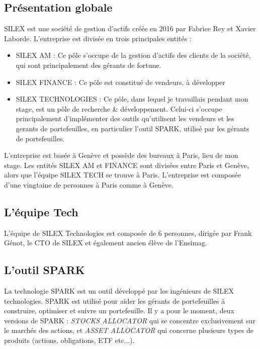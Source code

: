 \documentclass[11pt,a4paper]{article}
\begin{document}
\subsection{Présentation globale}
SILEX est une société de gestion d'actifs créée en 2016 par Fabrice Rey et Xavier Laborde. L'entreprise est divisée en trois principales entités : 
\begin{itemize}
    \item SILEX AM : Ce pôle s'occupe de la gestion d'actifs des clients de la société, qui sont principalement des gérants de fortune.
    \item SILEX FINANCE : Ce pôle est constitué de vendeurs. à développer%
    \item SILEX TECHNOLOGIES : Ce pôle, dans lequel je travaillais pendant mon stage, est un pôle de recherche \& développement. Celui-ci s'occupe principalement d'implémenter des outils qu'utilisent les vendeurs et les gerants de portefeuilles, en particulier l'outil SPARK, utilisé par les gérants de portefeuilles.
\end{itemize} 
\vspace{0.5em}

L'entreprise est basée à Genève et possède des bureaux à Paris, lieu de mon stage. Les entités SILEX AM et FINANCE sont divisées entre Paris et Genève, alors que l'équipe SILEX TECH se trouve à Paris. L'entreprise est composée d'une vingtaine de personnes à Paris comme à Genève.

\subsection{L'équipe Tech}
L'équipe de SILEX Technologies est composée de 6 personnes, dirigée par Frank Génot, le CTO de SILEX et également ancien élève de l'Ensimag. 

 \subsection{L'outil SPARK}
 La technologie SPARK est un outil développé par les ingénieurs de SILEX technologies. SPARK est utilisé pour aider les gérants de portefeuilles à construire, optimiser et suivre un portefeuille. Il y a pour le moment, deux versions de SPARK : \textit{STOCKS ALLOCATOR} qui se concentre exclusivement sur le marchés des actions, et \textit{ASSET ALLOCATOR} qui concerne plusieurs types de produits (actions, obligations, ETF etc...).  \vspace{0.5em}
 
\end{document}
